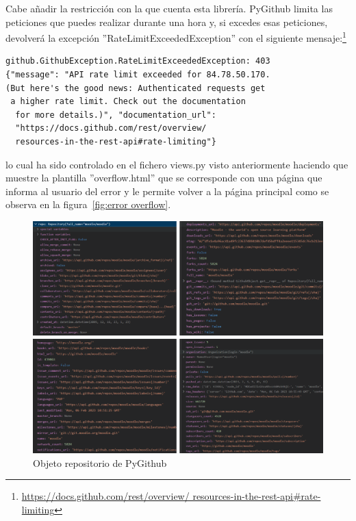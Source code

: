 \documentclass[a4paper, 12pt]{book}
\begin{document}
Cabe añadir la restricción con la que cuenta esta librería. PyGithub limita las peticiones que puedes realizar durante una hora y, si excedes esas peticiones, devolverá la excepción ''RateLimitExceededException'' con el siguiente mensaje:\footnote{\url{https://docs.github.com/rest/overview/
  resources-in-the-rest-api#rate-limiting}} \begin{verbatim}
github.GithubException.RateLimitExceededException: 403 
{"message": "API rate limit exceeded for 84.78.50.170. 
(But here's the good news: Authenticated requests get
 a higher rate limit. Check out the documentation
  for more details.)", "documentation_url": 
  "https://docs.github.com/rest/overview/
  resources-in-the-rest-api#rate-limiting"} 
\end{verbatim} lo cual ha sido controlado en el fichero views.py visto anteriormente haciendo que muestre la plantilla ''overflow.html'' que se corresponde con una página que informa al usuario del error y le permite volver a la página principal como se observa en la figura~\ref{fig:error overflow}.

\begin{figure}
    \centering
    \includegraphics[bb=0 0 800 600, width=12cm, keepaspectratio]{img/objeto_repositorio.png}
    \caption{Objeto repositorio de PyGithub}\label{fig:Objeto repositorio de PyGithub}
\end{figure}
\end{document}
